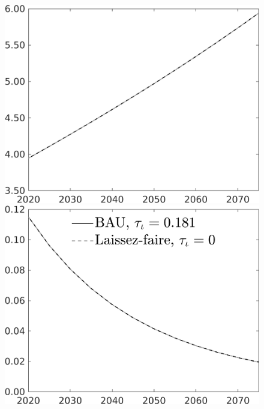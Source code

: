 \documentclass[12pt]{article}
\begin{document}
\begin{figure}[h!!]
\begin{minipage}[]{0.32\textwidth}
	\end{minipage}	
	\begin{minipage}[]{0.32\textwidth}
		\includegraphics[width=1\textwidth]{../../codding_model/own_basedOnFried/optimalPol_010922_revision/figures/all_13Sept22/CompTaul_LFBAU_Reg0_wh_spillover0_nsk1_xgr0_knspil1_sep1_countec0_GovRev0_etaa0.79_lgd0.png}
	\end{minipage}	
	\begin{minipage}[]{0.32\textwidth}
		\includegraphics[width=1\textwidth]{../../codding_model/own_basedOnFried/optimalPol_010922_revision/figures/all_13Sept22/CompTaul_LFBAU_Reg0_GFF_spillover0_nsk1_xgr0_knspil1_sep1_countec0_GovRev0_etaa0.79_lgd1.png}

\end{minipage}
\end{figure}
\end{document}
